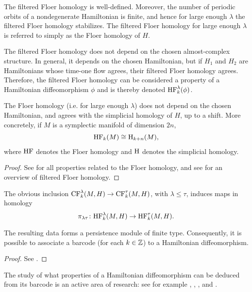\begin{prop}
The filtered Floer homology is well-defined. Moreover, the number of periodic orbits of a nondegenerate Hamiltonian is finite, and hence for large enough $\lambda$ the filtered Floer homology stabilizes. The filtered Floer homology for large enough $\lambda$ is referred to simply as the Floer homology of $H$.

The filtered Floer homology does not depend on the chosen almost-complex structure. In general, it depends on the chosen Hamiltonian, but if $H_1$ and $H_2$ are Hamiltonians whose time-one flow agrees, their filtered Floer homology agrees. Therefore, the filtered Floer homology can be considered a property of a Hamiltonian diffeomorphism $\phi$ and is thereby denoted $\mathrm{HF}_k^\lambda(\phi)$.

The Floer homology (i.e. for large enough $\lambda$) does not depend on the chosen Hamiltonian, and agrees with the simplicial homology of $H$, up to a shift. More concretely, if $M$ is a symplectic manifold of dimension $2n$,
\begin{equation}
\mathrm{HF}_k(M) \cong \mathrm{H}_{k+n}(M),
\end{equation}
where $\mathrm{HF}$ denotes the Floer homology and $\mathrm{H}$ denotes the simplicial homology.
\end{prop}

\begin{proof}
See \cite{audin} for all properties related to the Floer homology, and see \cite{polterovich} for an overview of filtered Floer homology.
\end{proof}

\begin{prop}
The obvious inclusion $\mathrm{CF}_k^\lambda(M,H) \to \mathrm{CF}_k^\tau(M,H)$, with $\lambda \leq \tau$, induces maps in homology
\begin{equation}
\pi_{\lambda\tau} \colon \mathrm{HF}_k^\lambda(M,H) \to \mathrm{HF}_k^\tau(M,H).
\end{equation}

The resulting data forms a persistence module of finite type. Consequently, it is possible to associate a barcode (for each $k \in \mathbb{Z}$) to a Hamiltonian diffeomorphism.
\end{prop}

\begin{proof}
See \cite{polterovich}.
\end{proof}

The study of what properties of a Hamiltonian diffeomorphism can be deduced from its barcode is an active area of research: see for example \cite{polterovich}, \cite{kislev2022bounds}, \cite{roux2018barcodes}, and \cite{polterovich2016autonomous}.

